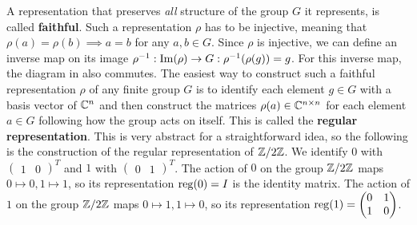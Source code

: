 A representation that preserves \textit{all} structure of the group $G$ it represents, is called \textbf{faithful}.
Such a representation $\rho$ has to be injective, meaning that $\rho(a) = \rho(b) \implies a = b$ for any $a, b \in G$.
Since $\rho$ is injective, we can define an inverse map on its image $\rho^{-1}: \operatorname{Im}(\rho) \to G: \rho^{-1}(\rho(g)) = g$.
For this inverse map, the diagram in  also commutes.
The easiest way to construct such a faithful representation $\rho$ of any finite group $G$ is to identify each element $g \in G$ with a basis vector of $\mathbb{C}^n$ and then construct the matrices $\rho(a) \in \mathbb{C}^{n \times n}$ for each element $a \in G$ following how the group acts on itself.
This is called the \textbf{regular representation}.
This is very abstract for a straightforward idea, so the following is the construction of the regular representation of $\mathbb{Z}/2\mathbb{Z}$.
We identify $0$ with $\begin{pmatrix}
    1 & 0
\end{pmatrix}^T$ and $1$ with $\begin{pmatrix}
    0 & 1
\end{pmatrix}^T$.
The action of $0$ on the group $\mathbb{Z}/2\mathbb{Z}$ maps $0 \mapsto 0, 1 \mapsto 1$, so its representation $\operatorname{reg}(0) = I$ is the identity matrix.
The action of $1$ on the group $\mathbb{Z}/2\mathbb{Z}$ maps $0 \mapsto 1, 1 \mapsto 0$, so its representation $\operatorname{reg}(1) = \begin{pmatrix}
    0 & 1 \\
    1 & 0
\end{pmatrix}$.
